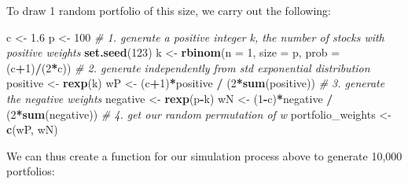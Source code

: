 \documentclass[11pt,]{article}
\newenvironment{Shaded}{\begin{snugshade}}{\end{snugshade}}
\newcommand{\CommentTok}[1]{\textcolor[rgb]{0.56,0.35,0.01}{\textit{#1}}}
\newcommand{\DataTypeTok}[1]{\textcolor[rgb]{0.13,0.29,0.53}{#1}}
\newcommand{\DecValTok}[1]{\textcolor[rgb]{0.00,0.00,0.81}{#1}}
\newcommand{\FloatTok}[1]{\textcolor[rgb]{0.00,0.00,0.81}{#1}}
\newcommand{\KeywordTok}[1]{\textcolor[rgb]{0.13,0.29,0.53}{\textbf{#1}}}
\newcommand{\NormalTok}[1]{#1}
\newcommand{\OperatorTok}[1]{\textcolor[rgb]{0.81,0.36,0.00}{\textbf{#1}}}
\newcommand{\StringTok}[1]{\textcolor[rgb]{0.31,0.60,0.02}{#1}}
\renewenvironment{quote}{\begin{shaded*}}{\end{shaded*}}
\begin{document}
\begin{quote}
To draw 1 random portfolio of this size, we carry out the following:
\end{quote}

\begin{Shaded}
\begin{Highlighting}[]
\NormalTok{c <-}\StringTok{ }\FloatTok{1.6}
\NormalTok{p <-}\StringTok{ }\DecValTok{100} 
\CommentTok{# 1. generate a positive integer k, the number of stocks with positive weights}
\KeywordTok{set.seed}\NormalTok{(}\DecValTok{123}\NormalTok{)}
\NormalTok{k <-}\StringTok{ }\KeywordTok{rbinom}\NormalTok{(}\DataTypeTok{n =} \DecValTok{1}\NormalTok{, }\DataTypeTok{size =}\NormalTok{ p, }\DataTypeTok{prob =}\NormalTok{ (c}\OperatorTok{+}\DecValTok{1}\NormalTok{)}\OperatorTok{/}\NormalTok{(}\DecValTok{2}\OperatorTok{*}\NormalTok{c))}
\CommentTok{# 2. generate independently from std exponential distribution  }
\NormalTok{positive <-}\StringTok{ }\KeywordTok{rexp}\NormalTok{(k)}
\NormalTok{wP <-}\StringTok{ }\NormalTok{(c}\OperatorTok{+}\DecValTok{1}\NormalTok{)}\OperatorTok{*}\NormalTok{positive }\OperatorTok{/}\StringTok{ }\NormalTok{(}\DecValTok{2}\OperatorTok{*}\KeywordTok{sum}\NormalTok{(positive)) }
\CommentTok{# 3. generate the negative weights }
\NormalTok{negative <-}\StringTok{ }\KeywordTok{rexp}\NormalTok{(p}\OperatorTok{-}\NormalTok{k)}
\NormalTok{wN <-}\StringTok{ }\NormalTok{(}\DecValTok{1}\OperatorTok{-}\NormalTok{c)}\OperatorTok{*}\NormalTok{negative }\OperatorTok{/}\StringTok{ }\NormalTok{(}\DecValTok{2}\OperatorTok{*}\KeywordTok{sum}\NormalTok{(negative))}
\CommentTok{# 4. get our random permutation of w  }
\NormalTok{portfolio_weights <-}\StringTok{ }\KeywordTok{c}\NormalTok{(wP, wN)}
\end{Highlighting}
\end{Shaded}

\begin{quote}
We can thus create a function for our simulation process above to
generate 10,000 portfolios:
\end{quote}
\end{document}
